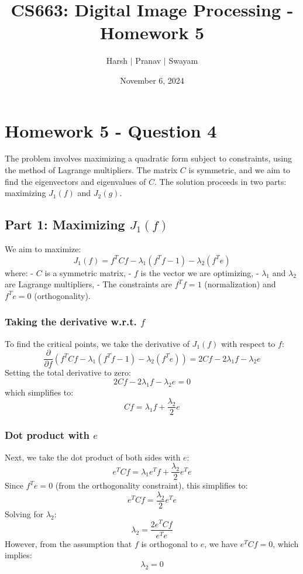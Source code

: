 \documentclass{article}
\title{CS663: Digital Image Processing - Homework 5}
\author{Harsh $\vert$ Pranav $\vert$ Swayam}
\date{November 6, 2024}
\begin{document}
\maketitle
\flushleft
\section*{Homework 5 - Question 4}

The problem involves maximizing a quadratic form subject to constraints, using the method of Lagrange multipliers. The matrix $C$ is symmetric, and we aim to find the eigenvectors and eigenvalues of $C$. The solution proceeds in two parts: maximizing $J_1(f)$ and $J_2(g)$.

\subsection*{Part 1: Maximizing $J_1(f)$}
We aim to maximize:
\[
J_1(f) = f^T C f - \lambda_1 (f^T f - 1) - \lambda_2 (f^T e)
\]
where:
- $C$ is a symmetric matrix,
- $f$ is the vector we are optimizing,
- $\lambda_1$ and $\lambda_2$ are Lagrange multipliers,
- The constraints are $f^T f = 1$ (normalization) and $f^T e = 0$ (orthogonality).

\subsubsection*{Taking the derivative w.r.t. $f$}

To find the critical points, we take the derivative of $J_1(f)$ with respect to $f$:
\[
\frac{\partial}{\partial f} (f^T C f - \lambda_1 (f^T f - 1) - \lambda_2 (f^T e)) = 2 C f - 2 \lambda_1 f - \lambda_2 e 
\]
Setting the total derivative to zero:
\[
2 C f - 2 \lambda_1 f - \lambda_2 e = 0
\]
which simplifies to:
\[
C f = \lambda_1 f + \frac{\lambda_2}{2} e
\]

\subsubsection*{Dot product with $e$}

Next, we take the dot product of both sides with $e$:
\[
e^T C f = \lambda_1 e^T f + \frac{\lambda_2}{2} e^T e
\]
Since $f^T e = 0$ (from the orthogonality constraint), this simplifies to:
\[
e^T C f = \frac{\lambda_2}{2} e^T e
\]
Solving for $\lambda_2$:
\[
\lambda_2 = \frac{2 e^T C f}{e^T e}
\]
However, from the assumption that $f$ is orthogonal to $e$, we have $e^T C f = 0$, which implies:
\[
\lambda_2 = 0
\]
\end{document}
